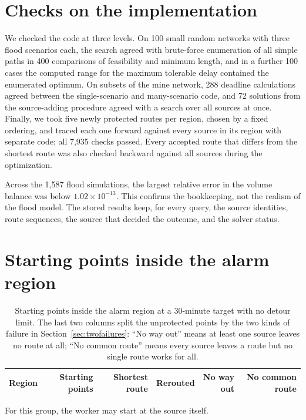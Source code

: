 \documentclass[11pt,a4paper]{article}
\begin{document}
\section{Checks on the implementation}\label{app:checks}
We checked the code at three levels. On 100 small random networks with three flood scenarios each, the search agreed with brute-force enumeration of all simple paths in 400 comparisons of feasibility and minimum length, and in a further 100 cases the computed range for the maximum tolerable delay contained the enumerated optimum. On subsets of the mine network, 288 deadline calculations agreed between the single-scenario and many-scenario code, and 72 solutions from the source-adding procedure agreed with a search over all sources at once. Finally, we took five newly protected routes per region, chosen by a fixed ordering, and traced each one forward against every source in its region with separate code; all 7,935 checks passed. Every accepted route that differs from the shortest route was also checked backward against all sources during the optimization.

Across the 1,587 flood simulations, the largest relative error in the volume balance was below $1.02\times10^{-13}$. This confirms the bookkeeping, not the realism of the flood model. The stored results keep, for every query, the source identities, route sequences, the source that decided the outcome, and the solver status.

\section{Starting points inside the alarm region}\label{app:inside}
\begin{table}[htbp]
\centering\small
\caption{Starting points inside the alarm region at a 30-minute target with no detour limit. The last two columns split the unprotected points by the two kinds of failure in Section~\ref{sec:twofailures}: ``No way out'' means at least one source leaves no route at all; ``No common route'' means every source leaves a route but no single route works for all.}
\begin{tabular}{@{}lrrrrr@{}}\toprule
Region & Starting points & Shortest route & Rerouted & No way out & No common route\\\midrule

\end{tabular}
\end{table}
For this group, the worker may start at the source itself.
\end{document}

